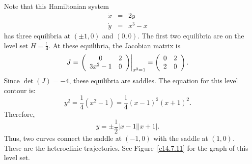 \documentclass{ximera}
\begin{document}
\begin{figure}[htb]
     \centerline{%
     }
\end{figure} 

Note that this Hamiltonian system
\begin{eqnarray*}
\dot{x}& = & 2y\\
\dot{y} &  =&  x^3 -x
\end{eqnarray*}
has three equilibria at $(\pm 1,0)$ and $(0,0)$.  The first two equilibria
are on the level set $H= \frac{1}{4}$.  At these equilibria, the Jacobian
matrix is
\[
J = \left.\left(\begin{array}{cc} 0 & 2\\ 3x^2-1 &0\end{array}\right)\right|_{x^2=1} = 
\left(\begin{array}{cc} 0 & 2\\ 2 &0\end{array}\right).
\]
Since $\det(J)=-4$, these equilibria are saddles.
The equation for this level contour is: 
\[
y^2=\frac{1}{4}(x^2-1)=\frac{1}{4}(x-1)^2(x+1)^2.
\]
Therefore,
\[
y = \pm\frac{1}{2}|x-1||x+1|.
\]
Thus, two curves connect the saddle at $(-1,0)$ with the saddle at $(1,0)$.
These are the heteroclinic trajectories. See
Figure~\ref{c14.7.11} for the graph of this level set.

\begin{figure}[htb]
     \centerline{%
      }
\end{figure} 
 
\end{document}

